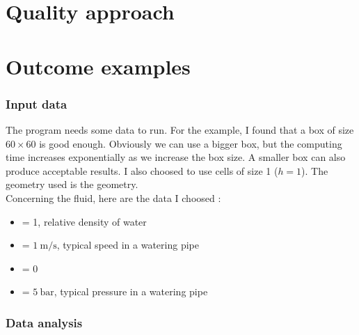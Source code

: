 \part{Quality approach}

\newpage
\part{Outcome examples}
\section{Input data}
The program needs some data to run. For the example, I found that a box of size
$\num{60} \times \num{60}$ is good enough. Obviously we can use a bigger box,
but the computing time increases exponentially as we increase the box size.
A smaller box can also produce acceptable results. I also choosed to use cells
of size 1 ($h = 1$). The geometry used is the  geometry.\\
Concerning the fluid, here are the data I choosed :
\begin{itemize}
      \item {} = 1, relative density of water
      \item {} = $\SI{1}{\meter\per\second}$, typical speed in a watering
            pipe
      \item {} = 0
      \item {} = $\SI{5}{\bar}$, typical pressure in a watering
            pipe
\end{itemize}

\section{Data analysis}

\newpage
\cite{potential-flow}
\newpage
\begin{multicols}{2}
    [\center{\printbibheading}]
    \printbibliography[heading=none]
\end{multicols}
